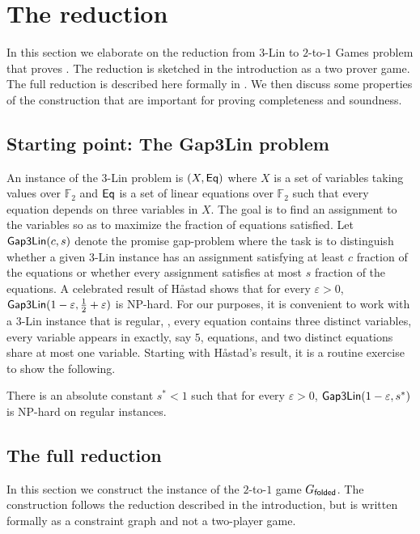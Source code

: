\documentclass{toc}
\newcommand\eps{\varepsilon}
\begin{document}
\section{The reduction}



In this section we elaborate on the reduction from $3$-Lin to $2$-to-$1$ Games problem that proves . The reduction is sketched in the introduction as a two prover game. The full reduction is described here formally in .
%
We then discuss some properties of the construction that are important for proving completeness and soundness.
%
\subsection{Starting point: The {\sf Gap3Lin} problem}

An instance of the $3$-Lin problem is
$(X, {\sf Eq})$ where $X$ is a set of variables taking values over ${\mathbb F}_2$ and ${\sf Eq}$ is a set of linear equations over
${\mathbb F}_2$ such that every equation depends on three variables in $X$. The goal is to find an assignment to the variables
so as to maximize the fraction of equations satisfied. Let ${\sf Gap3Lin}(c, s)$ denote the promise gap-problem
where the task is to distinguish whether a given $3$-Lin instance has an assignment satisfying at least $c$ fraction of
the equations or whether every assignment satisfies at most $s$ fraction of the equations.
A celebrated result of H\aa stad \cite{Has01} shows that for
%
every $\eps>0$, %
 ${\sf Gap3Lin}(1-\eps, \frac{1}{2}+\eps)$ is NP-hard. For our purposes, it is convenient to work with a $3$-Lin
 instance that is regular, \ie, every equation contains three distinct variables,  every variable appears in exactly, say $5$,
 equations, and two distinct equations share at most one variable.
 Starting with H{\aa}stad's result, it is a routine exercise to show
the following.  %

 \begin{theorem}\label{thm:3lin}  There is an absolute constant $s^* < 1$ such that for every %
 $\eps > 0$,
 ${\sf Gap3Lin}(1-\eps, s^*)$ is NP-hard on regular instances.
 \end{theorem}

\subsection{The full reduction}\label{sec:reduction}
\def\gnf{G_{\sf unfolded}}
\def\gf{G_{\sf folded}}
In this section we construct the instance of the $2$-to-$1$ game $\gf$. The construction follows the reduction described in the introduction, but is written formally as a constraint graph and not a two-player game.
\end{document}
